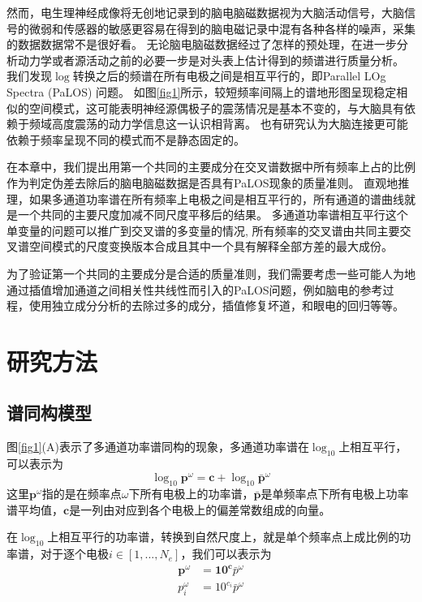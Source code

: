然而，电生理神经成像将无创地记录到的脑电脑磁数据视为大脑活动信号，大脑信号的微弱和传感器的敏感更容易在得到的脑电磁记录中混有各种各样的噪声，采集的数据数据常不是很好看。 无论脑电脑磁数据经过了怎样的预处理，在进一步分析动力学或者源活动之前的必要一步是对头表上估计得到的频谱进行质量分析。 我们发现$\log$转换之后的频谱在所有电极之间是相互平行的，即Parallel LOg Spectra (PaLOS) 问题。 如图\ref{fig1}所示，较短频率间隔上的谱地形图呈现稳定相似的空间模式，这可能表明神经源偶极子的震荡情况是基本不变的，与大脑具有依赖于频域高度震荡的动力学信息这一认识相背离。 也有研究认为大脑连接更可能依赖于频率呈现不同的模式而不是静态固定的。

在本章中，我们提出用第一个共同的主要成分在交叉谱数据中所有频率上占的比例作为判定伪差去除后的脑电脑磁数据是否具有PaLOS现象的质量准则。 直观地推理，如果多通道功率谱在所有频率上电极之间是相互平行的，所有通道的谱曲线就是一个共同的主要尺度加减不同尺度平移后的结果。 多通道功率谱相互平行这个单变量的问题可以推广到交叉谱的多变量的情况, 所有频率的交叉谱由共同主要交叉谱空间模式的尺度变换版本合成且其中一个具有解释全部方差的最大成份。

为了验证第一个共同的主要成分是合适的质量准则，我们需要考虑一些可能人为地通过插值增加通道之间相关性共线性而引入的PaLOS问题，例如脑电的参考过程，使用独立成分分析的去除过多的成分，插值修复坏道，和眼电的回归等等。 

\section{研究方法}
\subsection{谱同构模型}
图\ref{fig1}(A)表示了多通道功率谱同构的现象，多通道功率谱在$\log_{10}$上相互平行，可以表示为
\begin{equation}\label{eq1}
\log_{10}\mathbf{p}^\omega=\mathbf{c}+\log_{10}\bar{\mathbf{p}}^\omega
\end{equation}
这里$\mathbf{p}^\omega$指的是在频率点$\omega$下所有电极上的功率谱，$\bar{\mathbf{p}}$是单频率点下所有电极上功率谱平均值，$\mathbf{c}$是一列由对应到各个电极上的偏差常数组成的向量。

在$\log_{10}$上相互平行的功率谱，转换到自然尺度上，就是单个频率点上成比例的功率谱，对于逐个电极$i\in[1,...,N_e]$，我们可以表示为
\begin{equation}\label{eq2}
\begin{split}
\mathbf{p}^\omega& =\mathbf{10^c}\bar{p}^\omega\\
p_i^\omega& =10^{c_i}\bar{p}^\omega
\end{split}
\end{equation}

